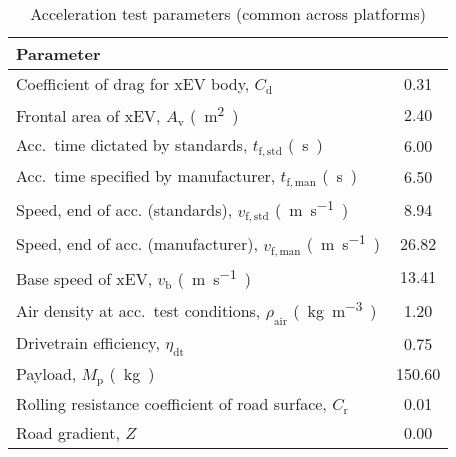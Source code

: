 

\begin{table}[!htbp]
	\centering
	\caption{Acceleration test parameters (common across  platforms)}
	\label{tbl:CommonVehicleParams}
	\begin{threeparttable}[t]
		\centering
		\begin{tabular*}{0.70\textwidth}{@{} l @{\extracolsep{\fill}}  S @{}}
			\toprule
			Parameter \\
			\midrule

			Coefficient of drag for xEV body, $C_\mathrm{d}$                           &  0.31    \\
			Frontal area of xEV, $A_\mathrm{v}$ \si{(m^2)}                             &  2.40    \\
			Acc.\ time dictated by standards, $t_\mathrm{f,std}$ \si{(s)}              &  6.00    \\
			Acc.\ time specified by manufacturer, $t_\mathrm{f,man}$ \si{(s)}          &  6.50    \\
			Speed, end of acc. (standards), $v_\mathrm{f,std}$ \si{(m.s^{-1})}         &  8.94    \\
			Speed, end of acc. (manufacturer), $v_\mathrm{f,man}$ \si{(m.s^{-1})}      &  26.82   \\
			Base speed of  xEV, $v_\mathrm{b}$ \si{(m.s^{-1})}                         &  13.41   \\
			Air density at acc.\ test conditions, $\rho_\mathrm{air}$ \si{(kg.m^{-3})} &  1.20    \\
			Drivetrain efficiency, $\eta_\mathrm{dt}$                                  &  0.75    \\
			Payload, $M_\mathrm{p}$ \si{(kg)}                                          &  150.60  \\
			Rolling resistance coefficient of road surface, $C_\mathrm{r}$             &  0.01    \\
			Road gradient, $Z$                                                         &  0.00    \\


\end{tabular*}
\end{threeparttable}
\end{table}
